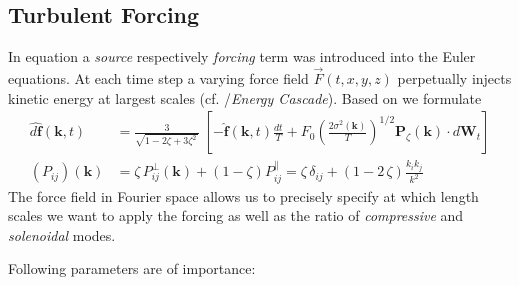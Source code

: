 \subsection{Turbulent Forcing}
\label{sec:turbuforcing}

In equation  a \emph{source} respectively
\emph{forcing} term was introduced into the Euler equations. At each time step
a varying force field $\vec{F}(t,x,y,z)$ perpetually injects kinetic energy at
largest scales (cf. /\emph{Energy Cascade}). Based on
\cite{schmidt2009numerical} we formulate
\begin{align}
  \hat{d\mathbf{f}}(\mathbf{k},t) &= \frac{3}{\sqrt{1-2\zeta+3\zeta^2\,}}\;\left[-\hat{\mathbf{f}}(\mathbf{k},t)\frac{dt}{T} + F_0 \left(\frac{2\sigma^2(\mathbf{k})}{T}\right)^{1/2}\mathbf{P}_\zeta(\mathbf{k})\cdot d\mathbf{W}_t\right]\\
  (P_{ij})(\mathbf{k}) &= \zeta\,P_{ij}^\perp(\mathbf{k}) + (1-\zeta) P_{ij}^\parallel =\zeta\,\delta_{ij} + (1-2\,\zeta) \frac{k_i k_j}{k^2}
\end{align}
The force field in Fourier space allows us to precisely specify at which
length scales we want to apply the forcing as well as the ratio of
\emph{compressive} and \emph{solenoidal} modes.

Following parameters are of importance:


